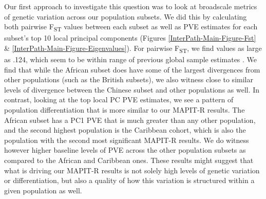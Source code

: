 \documentclass[12pt,a4paper]{article}
\begin{document}
Our first approach to investigate this question was to look at broadscale metrics of genetic variation across our population subsets. We did this by calculating both pairwise F\textsubscript{ST} values between each subset as well as PVE estimates for each subset's top 10 local principal components (Figures \ref{InterPath-Main-Figure-Fst} \& \ref{InterPath-Main-Figure-Eigenvalues}). For pairwise F\textsubscript{ST}, we find values as large as .124, which seem to be within range of previous global sample estimates \citep{Wang2012}. We find that while the African subset does have some of the largest divergences from other populations (such as the British subsets), we also witness close to similar levels of divergence between the Chinese subset and other populations as well. In contrast, looking at the top local PC PVE estimates, we see a pattern of population differentiation that is more similar to our MAPIT-R results. The African subset has a PC1 PVE that is much greater than any other population, and the second highest population is the Caribbean cohort, which is also the population with the second most significant MAPIT-R results. We do witness however higher baseline levels of PVE across the other population subsets as compared to the African and Caribbean ones. These results might suggest that what is driving our MAPIT-R results is not solely high levels of genetic variation or differentiation, but also a quality of how this variation is structured within a given population as well.
\end{document}
